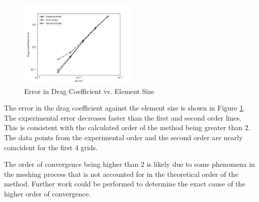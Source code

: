 \begin{figure}[H]
    \centering
    \includegraphics[width=0.5\textwidth]{Questions/Figures/richardson_error_vs_element_size.png}
    \caption{Error in Drag Coefficient vs. Element Size}
    \label{fig:richardson_error_vs_element_size}
\end{figure}
The error in the drag coefficient against the element size is shown in Figure \ref{fig:richardson_error_vs_element_size}. The experimental error decreases faster than the first and second order lines. This is consistent with the calculated order of the method being greater than 2. The data points from the experimental order and the second order are nearly coincident for the first 4 grids. 

The order of convergence being higher than 2 is likely due to some phenomena in the meshing process that is not accounted for in the theoretical order of the method. Further work could be performed to determine the exact cause of the higher order of convergence.

